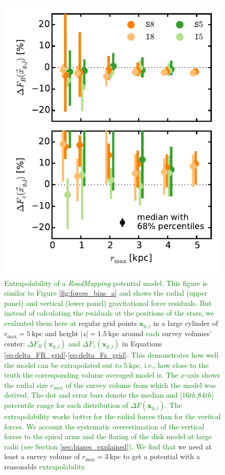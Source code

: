 \documentclass[iop,revtex4,numberedappendix,appendixfloats]{emulateapj}
\newcommand{\vect}[1]{\boldsymbol{#1}}
\newcommand{\RM}{{\sl RoadMapping}}
\newcommand{\NEW}[1]{\textcolor{Green}{#1}}
\newcommand{\OLD}[1]{}
\begin{document}
\begin{figure}[!htbp]
\centering
  \includegraphics[width=\columnwidth]{fig/MNdHHdiffSph2_bias_in_forces_recovery_3_b.pdf}
  \caption{\NEW{Extrapolability of a \RM{} potential model. This figure is similar to Figure \ref{fig:forces_bias_a} and shows the radial (upper panel) and vertical (lower panel) gravitational force residuals. But instead of calculating the residuals at the positions of the stars, we evaluated them here at} regular grid points \NEW{$\vect{x}_{g,j}$} in a large cylinder of $r_\text{max}=5~\text{kpc}$ and height $|z|=1.5~\text{kpc}$ around \OLD{the}\NEW{each} survey volumes' center\NEW{: $\Delta F_{R}(\vect{x}_{g,j})$ and $\Delta F_{z}(\vect{x}_{g,j})$} \OLD{($\Delta F_{R}(g_j)$ and $\Delta F_{z}(g_j)$} in Equations \eqref{eq:delta_FR_grid}-\eqref{eq:delta_Fz_grid}\OLD{)}. \NEW{This demonstrates how well the model can be extrapolated out to $5~\text{kpc}$, i.e., how close to the truth the corresponding volume averaged model is. The $x$-axis shows the radial size $r_\text{max}$ of the survey volume from which the model was derived. The dot and error bars denote the median and [$16th$,$84th$] percentile range for each distribution of $\Delta F(\vect{x}_{g,j})$. The extrapolability works better for the radial forces than for the vertical forces. We account the systematic overestimation of the vertical forces to the spiral arms and the flaring of the disk model at large radii (see Section \ref{sec:biases_explained}). We find that} we need at least a survey volume of $r_\text{max}=3~\text{kpc}$ to get a potential with a reasonable \OLD{predictive power.}\NEW{extrapolability.}}
\label{fig:forces_bias_b}
\end{figure}
\end{document}
